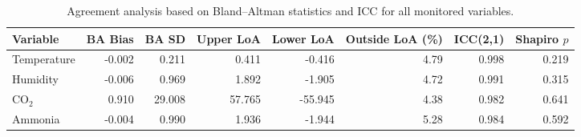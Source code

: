 \begin{table}[h]
\centering
\caption{Agreement analysis based on Bland--Altman statistics and ICC for all monitored variables.}
\label{tab:agreement_metrics}
\begin{tabular}{lrrrrrrr}
\hline
Variable & BA Bias & BA SD & Upper LoA & Lower LoA & Outside LoA (\%) & ICC(2,1) & Shapiro $p$ \\
\hline
Temperature & -0.002 & 0.211 & 0.411 & -0.416 & 4.79 & 0.998 & 0.219 \\
Humidity & -0.006 & 0.969 & 1.892 & -1.905 & 4.72 & 0.991 & 0.315 \\
CO$_2$ & 0.910 & 29.008 & 57.765 & -55.945 & 4.38 & 0.982 & 0.641 \\
Ammonia & -0.004 & 0.990 & 1.936 & -1.944 & 5.28 & 0.984 & 0.592 \\
\hline
\end{tabular}
\end{table}